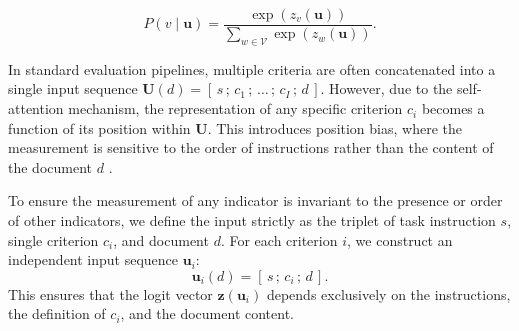 \begin{equation}
    P(v \mid \mathbf{u}) = \frac{\exp(z_v(\mathbf{u}))}{\sum_{w \in \mathcal{V}} \exp(z_w(\mathbf{u}))}.
\end{equation}

In standard evaluation pipelines, multiple criteria are often concatenated into a single input sequence $\mathbf{U}(d) = [\, s \,;\, c_1 \,;\, \dots \,;\, c_I \,;\, d \,]$. However, due to the self-attention mechanism, the representation of any specific criterion $c_i$ becomes a function of its position within $\mathbf{U}$. This introduces position bias, where the measurement is sensitive to the order of instructions rather than the content of the document $d$ \citep{shi_judging_2025}.

To ensure the measurement of any indicator is invariant to the presence or order of other indicators, we define the input strictly as the triplet of task instruction $s$, single criterion $c_i$, and document $d$. For each criterion $i$, we construct an independent input sequence $\mathbf{u}_i$:
\begin{equation}\label{eq:eval_triplet}
    \mathbf{u}_i(d) = [\, s \,;\, c_i \,;\, d \,].
\end{equation}
This ensures that the logit vector $\mathbf{z}(\mathbf{u}_i)$ depends exclusively on the instructions, the definition of $c_i$, and the document content.


